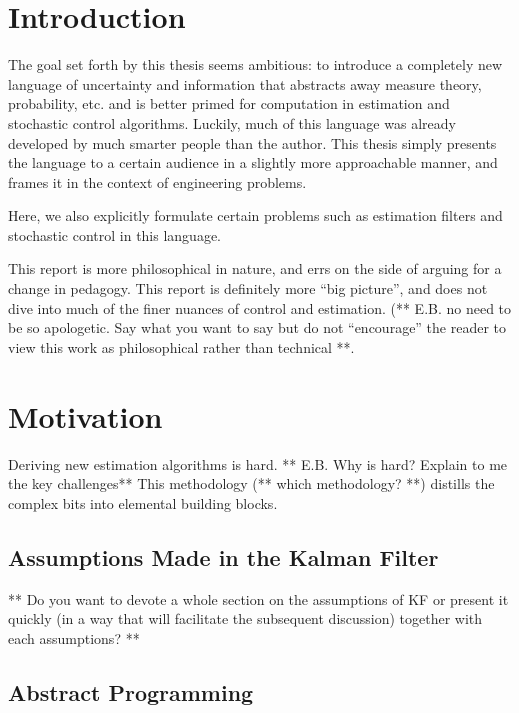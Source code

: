 \chapter{Introduction}

The goal set forth by this thesis seems ambitious: to introduce a completely new language of uncertainty and information that abstracts away measure theory, probability, etc. and is better primed for computation in estimation and stochastic control algorithms.
Luckily, much of this language was already developed by much smarter people than the author. This thesis simply presents the language to a certain audience in a slightly more approachable manner, and frames it in the context of engineering problems.

Here, we also explicitly formulate certain problems such as estimation filters and stochastic control in this language.

This report is more philosophical in nature, and errs on the side of arguing for a change in pedagogy.
This report is definitely more ``big picture'', and does not dive into much of the finer nuances of control and estimation. (** E.B. no need to be so apologetic. Say what you want to say but do not ``encourage'' the reader to view this work as philosophical rather than technical **.


\chapter{Motivation}

Deriving new estimation algorithms is hard. ** E.B. Why is hard? Explain to me the key challenges** 
This methodology (** which methodology? **) distills the complex bits into elemental building blocks.


\section{Assumptions Made in the Kalman Filter}
** Do you want to devote a whole section on the assumptions of KF or present it quickly (in  a way that will facilitate the subsequent discussion) together with each assumptions? ** 

\section{Abstract Programming}

